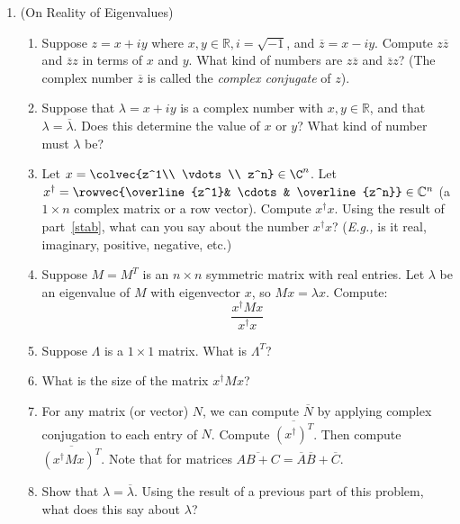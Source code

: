 


\begin{enumerate}
\item\label{prob_real_eigenvalues} (On Reality of Eigenvalues) \begin{enumerate}
\item\label{stab}
Suppose $z=x+iy$ where $x,y \in \mathbb{R}, i=\sqrt{-1}$, and $\overline{z}=x-iy$. Compute $z\overline{z}$ and $\overline{z}z$ in terms of \(x\) and \(y\). What kind of numbers are \(z \overline{z}\) and \(\overline{z}z\)? (The complex number \(\overline{z}\) is called the \emph{complex conjugate} of \(z\)).

\item Suppose that \(\lambda=x+iy\) is a complex number with \(x,y \in \mathbb{R}\), and that $\lambda=\overline{\lambda}$. Does this determine the value of \(x\) or \(y\)? What kind of number must \(\lambda\) be?

\item Let $x=\colvec{z^1\\ \vdots \\ z^n}\in \C^n$.  Let $x^\dagger=\rowvec{\overline{z^1}& \cdots & \overline{z^n}} \in \mathbb{C}^n$ (a $1 \times n$ complex matrix or a row vector).  Compute $x^\dagger x$.  Using the result of part~\ref{stab}, what can you say about the number $x^\dagger x$? ({\itshape E.g.,} is it real, imaginary, positive, negative, etc.)

\item Suppose $M=M^T$ is an $n\times n$ symmetric matrix with real entries.  Let $\lambda$ be an eigenvalue of $M$ with eigenvector $x$, so $Mx=\lambda x$. Compute:
\[
\frac{x^\dagger Mx}{x^\dagger x}
\]

\item Suppose $\Lambda$ is a $1\times 1$ matrix.  What is $\Lambda^T$?

\item What is the size of the matrix $x^\dagger Mx$?

\item For any matrix (or vector) $N$, we can compute $\overline{N}$ by applying complex conjugation to each entry of $N$.
Compute $\overline{(x^\dagger)^T}$.  
Then compute $\overline{(x^\dagger M x)^T}$.
Note that for matrices $\overline{AB + C} = \overline{A} \overline{B} + \overline{C}$.

\item Show that $\lambda=\overline{\lambda}$.  Using the result of a previous part of this problem, what does this say about $\lambda$?
\end{enumerate}


\end{enumerate}
